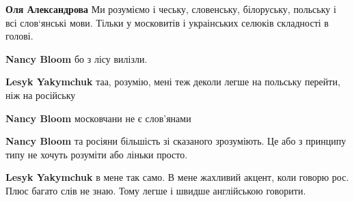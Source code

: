 \begin{itemize}
\begin{itemize}
 
\textbf{Оля Александрова} Ми розуміємо і чеську, словенську, білоруську, польську і всі слов‘янські мови. Тільки у московитів і украінських селюків складності в голові.

 
\textbf{Nancy Bloom} бо з лісу вилізли.

 
\textbf{Lesyk Yakymchuk} таа, розумію, мені теж деколи легше на польську перейти, ніж на російську

 
\textbf{Nancy Bloom} московчани не є слов'янами

 
\textbf{Nancy Bloom} та росіяни більшість зі сказаного зрозуміють. Це або з принципу типу не хочуть розуміти або ліньки просто.

 
\textbf{Lesyk Yakymchuk} в мене так само. В мене жахливий акцент, коли говорю
рос. Плюс багато слів не знаю. Тому легше і швидше англійською говорити.
\end{itemize}


\end{itemize}
